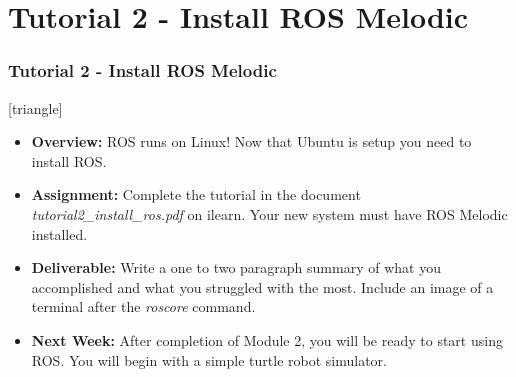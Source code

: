 \documentclass[fleqn]{beamer}                         %
\newcommand{\vspc}{\vspace{2mm}\\}     %
\newcommand{\sectiontitleV}{Tutorial 2 - Install ROS Melodic}
\begin{document}
\section{\sectiontitleV}	
	            \begin{frame}[label=sectionV] \small
		\frametitle{\sectiontitleV}    
	
 [triangle]
                \begin{itemize}

					\item {\bf Overview:} ROS runs on Linux! Now that Ubuntu is setup you need to install ROS. 		

					\item {\bf Assignment:} Complete the tutorial in the document {\it tutorial2\_install\_ros.pdf} on ilearn. Your new system must have ROS Melodic installed.
                    
                    \item {\bf Deliverable:} Write a one to two paragraph summary of what you accomplished and what you struggled with the most. Include an image of a terminal after the {\it roscore} command. 
    
                    \item {\bf Next Week:} After completion of Module 2, you will be ready to start using ROS. You will begin with a simple turtle robot simulator. \vspc
                    
                    
    
                    
                \end{itemize}
		\end{frame}
\end{document}
